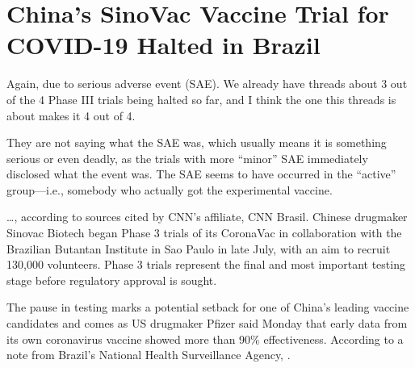 \chapter{China's SinoVac Vaccine Trial for COVID-19 Halted in Brazil}

\begin{refsection}

Again, due to serious adverse event (SAE). We already have threads about 3 out of the 4 Phase III trials being halted so far, and I think the one this threads is about makes it 4 out of 4.\textsuperscript{\cite{urle755db81}}

They are not saying what the SAE was, which usually means it is something serious or even deadly, as the trials with more \enquote{minor} SAE immediately disclosed what the event was. The SAE seems to have occurred in the \enquote{active} group---i.e., somebody who actually got the experimental vaccine.

\begin{tcolorbox}[quote]

\dots{}, according to sources cited by CNN's affiliate, CNN Brasil. Chinese drugmaker Sinovac Biotech began Phase 3 trials of its CoronaVac in collaboration with the Brazilian Butantan Institute in Sao Paulo in late July, with an aim to recruit 130,000 volunteers. Phase 3 trials represent the final and most important testing stage before regulatory approval is sought.

The pause in testing marks a potential setback for one of China's leading vaccine candidates and comes as US drugmaker Pfizer said Monday\textsuperscript{\cite{urlb3f2aa06}} that early data from its own coronavirus vaccine showed more than 90\% effectiveness. According to a note from Brazil's National Health Surveillance Agency, .\textsuperscript{\cite{urlc285497e}}

\end{tcolorbox}

\printbibliography[heading=subbibliography]

\end{refsection}
